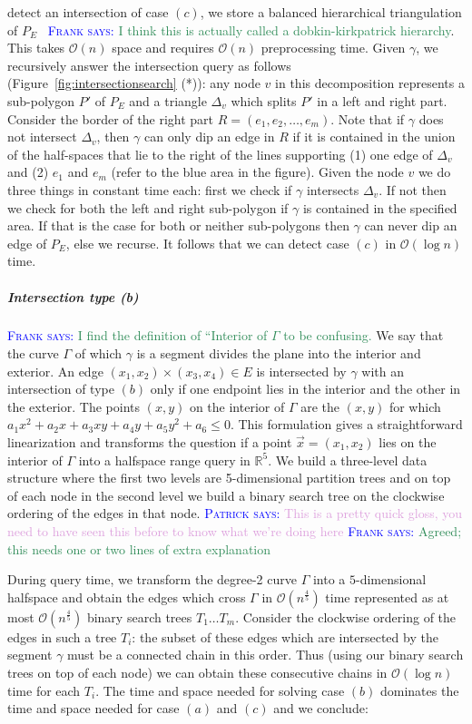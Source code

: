 \documentclass[UKenglish]{lipics-v2019}
\newcommand{\myremark}[4]{\textcolor{blue}{\textsc{#1 #2:}} \textcolor{#4}{\textsf{#3}}}
\newcommand{\frank}[2][says]{\myremark{Frank}{#1}{#2}{SeaGreen}}
\newcommand{\patrick}[2][says]{\myremark{Patrick}{#1}{#2}{Plum}}
\newcommand{\mkmcal}[1]{\ensuremath{\mathcal{#1}}\xspace}
\renewcommand{\O}{\mkmcal{O}}
\begin{document}
detect an intersection of case $(c)$, we store a balanced hierarchical
triangulation of $P_E$~\cite{dobkin1983intersection} \frank{I think this is
  actually called a dobkin-kirkpatrick hierarchy}. This takes $\O(n)$ space
and requires $\O(n)$ preprocessing time. Given $\gamma$, we recursively answer
the intersection query as follows (Figure~\ref{fig:intersectionsearch} (*)):
any node $v$ in this decomposition represents a sub-polygon $P'$ of $P_E$ and a
triangle $\Delta_v$ which splits $P'$ in a left and right part. Consider the
border of the right part $R = (e_1, e_2, \ldots, e_m)$. Note that if $\gamma$
does not intersect $\Delta_v$, then $\gamma$ can only dip an edge in $R$ if it
is contained in the union of the half-spaces that lie to the right of the lines
supporting (1) one edge of $\Delta_v$ and (2) $e_1$ and $e_m$ (refer to the
blue area in the figure). Given the node $v$ we do three things in constant
time each: first we check if $\gamma$ intersects $\Delta_v$. If not then we
check for both the left and right sub-polygon if $\gamma$ is contained in the
specified area. If that is the case for both or neither sub-polygons then
$\gamma$ can never dip an edge of $P_E$, else we recurse. It follows that we
can detect case $(c)$ in $\mathcal{O}(\log n)$ time.

\subparagraph{Intersection type (b)}

\frank{I find the definition of ``Interior of $\Gamma$ to be confusing.}
We say that the curve $\Gamma$ of which $\gamma$ is a segment divides the plane into the interior and exterior. An edge $(x_1, x_2) \times (x_3, x_4) \in E$ is intersected by $\gamma$ with an intersection of type $(b)$ only if one endpoint lies in the interior and the other in the exterior. The points $(x,y)$ on the interior of $\Gamma$ are the $(x, y)$ for which $a_1 x^2 + a_2 x + a_3 xy + a_4 y + a_5 y^2 + a_6 \le 0$. This formulation gives a straightforward linearization and transforms the question if a point $\vec{x} = (x_1, x_2)$ lies on the interior of $\Gamma$ into a halfspace range query in $\mathbb{R}^5$. 
We build a three-level data structure where the first two levels are 5-dimensional partition trees and on top of each node in the second level we build a binary search tree on the clockwise ordering of the edges in that node. \patrick{This is a pretty quick gloss, you need to have seen this before to know what we're doing here}
\frank{Agreed; this needs one or two lines of extra explanation}

During query time, we transform the degree-2 curve $\Gamma$ into a $5$-dimensional halfspace and obtain the edges which cross $\Gamma$ in $\mathcal{O}(n^ {\frac{4}{5}})$ time represented as at most $\mathcal{O}(n^ {\frac{4}{5}})$ binary search trees $T_1 \ldots T_m$. Consider the clockwise ordering of the edges in such a tree $T_i$: the subset of these edges which are intersected by the segment $\gamma$ must be a connected chain in this order. Thus (using our binary search trees on top of each node) we can obtain these consecutive chains in $\mathcal{O}(\log n)$ time for each $T_i$. The time and space needed for solving case $(b)$ dominates the time and space needed for case $(a)$ and $(c)$ and we conclude:
\end{document}
